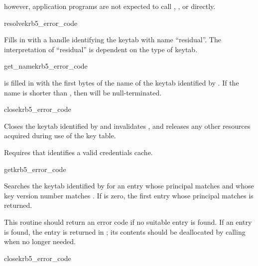  however, application programs are not expected to call
, ,
or  directly.

\begin{funcdecl}{resolve}{krb5_error_code}{\funcin}
\funcout
{}
\end{funcdecl}

Fills in  with a handle identifying the keytab with name
``residual''.  The interpretation of ``residual'' is dependent on the
type of keytab.

\begin{funcdecl}{get_name}{krb5_error_code}{\funcin}
\funcout
{}
\funcin
{}
\end{funcdecl}

 is filled in with the first  bytes of
the name of the keytab identified by .
If the name is shorter than , then 
will be null-terminated.

\begin{funcdecl}{close}{krb5_error_code}{\funcin}
\end{funcdecl}

Closes the keytab identified by  and invalidates
, and releases any other resources acquired during use of
the key table.

Requires that  identifies a valid credentials cache.

\begin{funcdecl}{get}{krb5_error_code}{\funcin}
\funcout
{}
\end{funcdecl}

Searches the keytab identified by  for an entry whose
principal matches  and
whose key version number matches .  If  is
zero, the first entry whose principal matches is returned.

This routine should return an error code if no suitable entry is
found.  If an entry is found, the entry is returned in
; its contents should be deallocated by calling
 when no longer needed.

\begin{funcdecl}{close}{krb5_error_code}{\funcinout}
\end{funcdecl}

